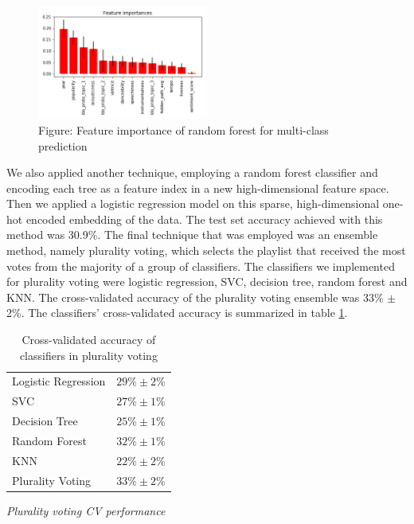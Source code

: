 \documentclass[acmtog]{acmart}
\begin{document}
\begin{figure}[h]
  \includegraphics[width=0.5\textwidth]{feature_importance2.png}
  \caption{Figure: Feature importance of random forest for multi-class prediction}
  \label{fig:ROC_curve}
\end{figure}

\newpage

We also applied another technique, employing a random forest classifier and encoding each tree as a feature index in a new high-dimensional feature space. Then we applied a logistic regression model on this sparse, high-dimensional one-hot encoded embedding of the data. The test set accuracy achieved with this method was 30.9\%.
The final technique that was employed was an ensemble method, namely plurality voting, which selects the playlist that received the most votes from the majority of a group of classifiers. The classifiers we implemented for plurality voting were logistic regression, SVC, decision tree, random forest and KNN. The cross-validated accuracy of the plurality voting ensemble was 33\% $\pm$ 2\%. The classifiers' cross-validated accuracy is summarized in table \ref{tab:two}.
\begin{table}%
\caption{Cross-validated accuracy of classifiers in plurality voting}
\label{tab:two}
\begin{minipage}{\columnwidth}
\begin{center}
\begin{tabular}{ll}
  \toprule
  Logistic Regression    & $29\% \pm 2\%$\\
  SVC  & $27\% \pm 1\%$\\
  Decision Tree  & $25\% \pm 1\%$\\
  Random Forest  & $32\% \pm 1\%$\\
  KNN  & $22\% \pm 2\%$\\
  Plurality Voting  & $33\% \pm 2\%$\\
  \bottomrule
\end{tabular}
\end{center}
\bigskip\centering
\footnotesize
 \emph{Plurality voting CV performance}
\end{minipage}
\end{table}%
\newpage
\end{document}
